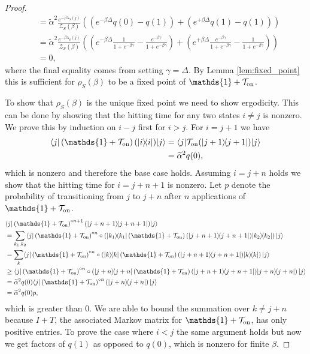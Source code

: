 \documentclass{article}
\newcommand{\on}{\rm on}
\newcommand{\ket}[1]{|#1\rangle}
\newcommand{\bra}[1]{\langle #1|}
\newcommand{\ketbra}[2]{| #1\rangle\! \langle #2|}
\newcommand{\TT}{\mathcal{T}}
\newcommand{\partfun}{\mathcal{Z}}
\newcommand{\identity}{\mathds{1}}
\begin{document}
\begin{proof}
\begin{align}
        &= \widetilde{\alpha}^2 \frac{e^{-\beta \lambda_S(j)}}{\partfun_S(\beta)} \left( \left(e^{-\beta \Delta} q(0) - q(1) \right) + \left(e^{+\beta \Delta} q(1) - q(1) \right)\right) \\
        &= \widetilde{\alpha}^2 \frac{e^{-\beta \lambda_S(j)}}{\partfun_S(\beta)} \left( \left(e^{-\beta \Delta} \frac{1}{1 + e^{-\beta \gamma}} - \frac{e^{-\beta \gamma}}{1 + e^{-\beta \gamma}} \right) + \left(e^{+\beta \Delta} \frac{e^{-\beta \gamma}}{1 + e^{-\beta \gamma}} - \frac{1}{1 + e^{-\beta \gamma}} \right)\right) \\
        &= 0,
    \end{align}
    where the final equality comes from setting $\gamma = \Delta$. By Lemma \ref{lem:fixed_point} this is sufficient for $\rho_S(\beta)$ to be a fixed point of $\identity + \TT_{\on}$. 
    
    To show that $\rho_S(\beta)$ is the unique fixed point we need to show ergodicity. This can be done by showing that the hitting time for any two states $i \neq j$ is nonzero. We prove this by induction on $i - j$ first for $i > j$. For $i = j + 1$ we have
    \begin{align}
        \bra{j} \left( \identity + \TT_{\on} \right)(\ketbra{i}{i}) \ket{j} &= \bra{j} \TT_{\on}(\ketbra{j + 1}{j + 1}) \ket{j} \\
        &= \widetilde{\alpha}^2 q(0),
    \end{align} 
    which is nonzero and therefore the base case holds. Assuming $i = j + n$ holds we show that the hitting time for $i = j + n + 1$ is nonzero. Let $p$ denote the probability of transitioning from $j$ to $j + n$ after $n$ applications of $\identity + \TT_{\on}$. 
    \begin{align}
        &\bra{j } \left(\identity + \TT_{\on} \right)^{\circ n + 1} (\ketbra{j+ n + 1}{j+ n + 1}) \ket{j } \nonumber \\
        &= \sum_{k_1, k_2}\bra{j } \left(\identity + \TT_{\on} \right)^{\circ n} \circ \left(\ketbra{k_1}{k_1}\left(\identity + \TT_{\on} \right) (\ketbra{j+ n + 1}{j+ n + 1}) \ketbra{k_2}{k_2} \right) \ket{j } \\
        &= \sum_{k}\bra{j } \left(\identity + \TT_{\on} \right)^{\circ n} \circ \left(\ketbra{k}{k}\left(\identity + \TT_{\on} \right) (\ketbra{j+ n + 1}{j+ n + 1}) \ketbra{k}{k} \right) \ket{j } \\
        &\ge \bra{j } \left(\identity + \TT_{\on} \right)^{\circ n} \circ \left(\ketbra{j + n}{j + n}\left(\identity + \TT_{\on} \right) (\ketbra{j+ n + 1}{j+ n + 1}) \ketbra{j + n}{j + n} \right) \ket{j } \\
        &= \widetilde{\alpha}^2 q(0) \bra{j } \left(\identity + \TT_{\on} \right)^{\circ n} \left(\ketbra{j + n}{j + n}\right)\ket{j } \\
        &= \widetilde{\alpha}^2 q(0) p,
    \end{align}
    which is greater than 0. We are able to bound the summation over $k \neq j + n$ because $I + T$, the associated Markov matrix for $\identity + \TT_{\on}$, has only positive entries. To prove the case where $i < j$ the same argument holds but now we get factors of $q(1)$ as opposed to $q(0)$, which is nonzero for finite $\beta$. 


\end{proof}
\end{document}
